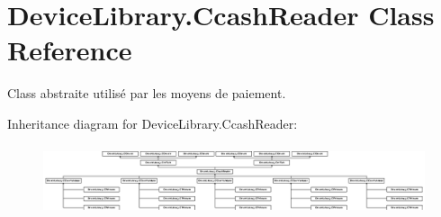 \hypertarget{class_device_library_1_1_ccash_reader}{}\section{Device\+Library.\+Ccash\+Reader Class Reference}
\label{class_device_library_1_1_ccash_reader}


Class abstraite utilisé par les moyens de paiement.  


Inheritance diagram for Device\+Library.\+Ccash\+Reader\+:\begin{figure}[H]
\begin{center}
\leavevmode
\includegraphics[height=2.052356cm]{class_device_library_1_1_ccash_reader}
\end{center}
\end{figure}
